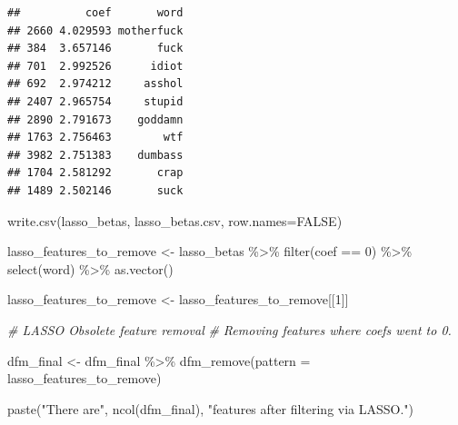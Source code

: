\documentclass[
]{article}
\newenvironment{Shaded}{\begin{snugshade}}{\end{snugshade}}
\newcommand{\AttributeTok}[1]{\textcolor[rgb]{0.77,0.63,0.00}{#1}}
\newcommand{\CommentTok}[1]{\textcolor[rgb]{0.56,0.35,0.01}{\textit{#1}}}
\newcommand{\ConstantTok}[1]{\textcolor[rgb]{0.00,0.00,0.00}{#1}}
\newcommand{\DecValTok}[1]{\textcolor[rgb]{0.00,0.00,0.81}{#1}}
\newcommand{\FunctionTok}[1]{\textcolor[rgb]{0.00,0.00,0.00}{#1}}
\newcommand{\NormalTok}[1]{#1}
\newcommand{\OtherTok}[1]{\textcolor[rgb]{0.56,0.35,0.01}{#1}}
\newcommand{\SpecialCharTok}[1]{\textcolor[rgb]{0.00,0.00,0.00}{#1}}
\newcommand{\StringTok}[1]{\textcolor[rgb]{0.31,0.60,0.02}{#1}}
\begin{document}
\begin{Shaded}
\end{Shaded}

\begin{verbatim}
##          coef       word
## 2660 4.029593 motherfuck
## 384  3.657146       fuck
## 701  2.992526      idiot
## 692  2.974212     asshol
## 2407 2.965754     stupid
## 2890 2.791673    goddamn
## 1763 2.756463        wtf
## 3982 2.751383    dumbass
## 1704 2.581292       crap
## 1489 2.502146       suck
\end{verbatim}

\begin{Shaded}
\begin{Highlighting}[]
\FunctionTok{write.csv}\NormalTok{(lasso\_betas, }\StringTok{\textquotesingle{}lasso\_betas.csv\textquotesingle{}}\NormalTok{, }\AttributeTok{row.names=}\ConstantTok{FALSE}\NormalTok{)}

\NormalTok{lasso\_features\_to\_remove }\OtherTok{\textless{}{-}}\NormalTok{ lasso\_betas }\SpecialCharTok{\%\textgreater{}\%}
  \FunctionTok{filter}\NormalTok{(coef }\SpecialCharTok{==} \DecValTok{0}\NormalTok{) }\SpecialCharTok{\%\textgreater{}\%}
  \FunctionTok{select}\NormalTok{(word) }\SpecialCharTok{\%\textgreater{}\%}
  \FunctionTok{as.vector}\NormalTok{()}

\NormalTok{lasso\_features\_to\_remove }\OtherTok{\textless{}{-}}\NormalTok{ lasso\_features\_to\_remove[[}\DecValTok{1}\NormalTok{]]}

\CommentTok{\# LASSO Obsolete feature removal }
\CommentTok{\# Removing features where coefs went to 0. }

\NormalTok{dfm\_final }\OtherTok{\textless{}{-}}\NormalTok{ dfm\_final }\SpecialCharTok{\%\textgreater{}\%}
  \FunctionTok{dfm\_remove}\NormalTok{(}\AttributeTok{pattern =}\NormalTok{ lasso\_features\_to\_remove)}

\FunctionTok{paste}\NormalTok{(}\StringTok{"There are"}\NormalTok{, }\FunctionTok{ncol}\NormalTok{(dfm\_final), }\StringTok{"features after filtering via LASSO."}\NormalTok{)}
\end{Highlighting}
\end{Shaded}
\end{document}
